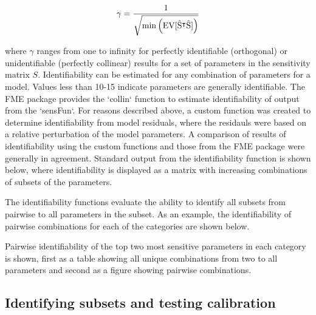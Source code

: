 \documentclass[letterpaper,12pt,oneside]{article}\usepackage[]{graphicx}\usepackage[]{color}
\begin{document}
\begin{equation}
\gamma = \frac{1} {\sqrt{ \min \left(\rm{EV}[\hat{S}^\intercal \hat{S}]\right)}}
\end{equation}

where $\gamma$ ranges from one to infinity for perfectly identifiable (orthogonal) or unidentifiable (perfectly collinear) results for a set of parameters in the sensitivity matrix $S$.  Identifiability can be estimated for any combination of parameters for a model.  Values less than 10-15 indicate parameters are generally identifiable.  The FME package provides the `collin` function to estimate identifiability of output from the `sensFun`.  For reasons described above, a custom function was created to determine identifiability from model residuals, where the residauls were based on a relative perturbation of the model parameters.  A comparison of results of identifiability using the custom functions and those from the FME package were generally in agreement.  Standard output from the identifiability function is shown below, where identifiability is displayed as a matrix with increasing combinations of subsets of the parameters.    



The identifiability functions evaluate the ability to identify all subsets from pairwise to all parameters in the subset.  As an example, the identifiability of pairwise combinations for each of the categories are shown below.



Pairwise identifiability of the top two most sensitive parameters in each category is shown, first as a table showing all unique combinations from two to all parameters and second as a figure showing pairwise combinations.

\subsection{Identifying subsets and testing calibration}
\end{document}
